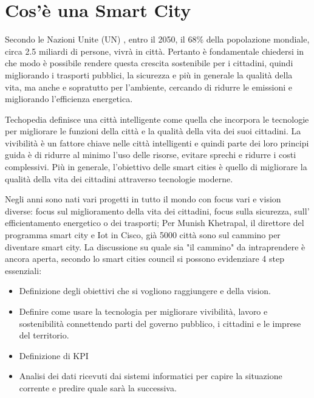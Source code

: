 \chapter{Cos'è una Smart City\label{cap1}}

Secondo le Nazioni Unite (UN) \cite{UNProjection}, entro il 2050, il 68\% della popolazione mondiale, circa 2.5 miliardi di persone, vivrà in città. Pertanto è fondamentale chiedersi in che modo è possibile rendere questa crescita sostenibile per i cittadini, quindi migliorando i trasporti pubblici, la sicurezza e più in generale la qualità della vita, ma anche e sopratutto per l'ambiente, cercando di ridurre le emissioni e migliorando l'efficienza energetica.

Techopedia definisce \cite{SmartCityDefinition} una città intelligente come quella che incorpora le tecnologie per migliorare le funzioni della città e la qualità della vita dei suoi cittadini. La vivibilità è un fattore chiave nelle città intelligenti e quindi parte dei loro principi guida è di ridurre al minimo l'uso delle risorse, evitare sprechi e ridurre i costi complessivi. Più in generale, l'obiettivo delle smart cities è quello di migliorare la qualità della vita dei cittadini attraverso tecnologie moderne.

Negli anni sono nati vari progetti in tutto il mondo con focus vari e vision diverse: focus sul miglioramento della vita dei cittadini, focus sulla sicurezza, sull' efficientamento energetico o dei trasporti; Per Munish Khetrapal, il direttore del programma smart city e Iot in Cisco, già 5000 città sono sul cammino per diventare smart city.
La discussione su quale sia "il cammino" da intraprendere è ancora aperta, secondo lo smart cities council si possono evidenziare 4 step essenziali:
\begin{itemize}
\item Definizione degli obiettivi che si vogliono raggiungere e della vision. 
\item Definire come usare la tecnologia per migliorare vivibilità, lavoro e sostenibilità connettendo parti del governo pubblico, i cittadini e le imprese del territorio.
\item Definizione di KPI
\item Analisi dei dati ricevuti dai sistemi informatici per capire la situazione corrente e predire quale sarà la successiva.
\end{itemize}

